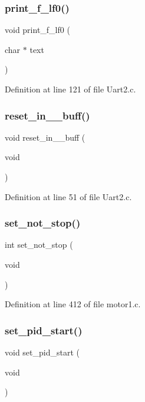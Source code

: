 \subsubsection{print\+\_\+f\+\_\+lf0()}
{\footnotesize\ttfamily void print\+\_\+f\+\_\+lf0 (\begin{DoxyParamCaption}\item[{char $\ast$}]{text }\end{DoxyParamCaption})}



Definition at line 121 of file Uart2.\+c.

\mbox{\label{main_8c_a1a9be6058ee2ceaa226196bb0a73ba34}} 
\subsubsection{reset\+\_\+in\+\_\+\_\+buff()}
{\footnotesize\ttfamily void reset\+\_\+in\+\_\+\_\+buff (\begin{DoxyParamCaption}\item[{void}]{ }\end{DoxyParamCaption})}



Definition at line 51 of file Uart2.\+c.

\mbox{\label{main_8c_a1f1537adeeb42279cc3045e28ee51b21}} 
\subsubsection{set\+\_\+not\+\_\+stop()}
{\footnotesize\ttfamily int set\+\_\+not\+\_\+stop (\begin{DoxyParamCaption}\item[{void}]{ }\end{DoxyParamCaption})}



Definition at line 412 of file motor1.\+c.

\mbox{\label{main_8c_a295254d87ad35bad08a608988bdb4fd3}} 
\subsubsection{set\+\_\+pid\+\_\+start()}
{\footnotesize\ttfamily void set\+\_\+pid\+\_\+start (\begin{DoxyParamCaption}\item[{void}]{ }\end{DoxyParamCaption})}



